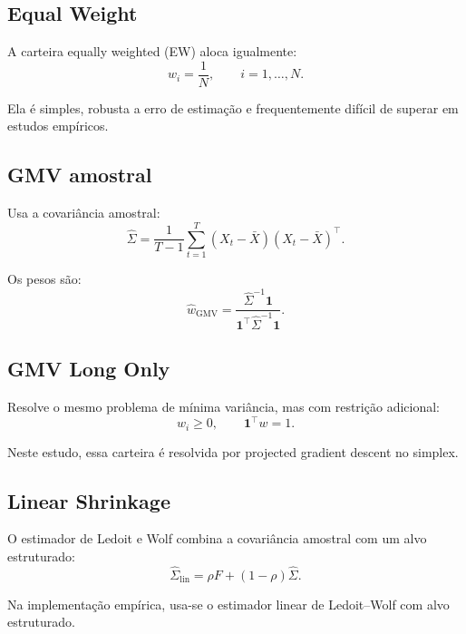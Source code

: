 \documentclass[12pt,a4paper]{article}
\newcommand{\one}{\mathbf{1}}
\newcommand{\what}{\widehat{w}}
\newcommand{\Sigmahat}{\widehat{\Sigma}}
\begin{document}
\subsection{Equal Weight}

A carteira equally weighted (EW) aloca igualmente:
\begin{equation}
  w_i = \frac{1}{N}, \qquad i=1,\dots,N.
\end{equation}

Ela é simples, robusta a erro de estimação e frequentemente difícil de superar em estudos
empíricos.

\subsection{GMV amostral}

Usa a covariância amostral:
\begin{equation}
  \Sigmahat
  =
  \frac{1}{T-1}
  \sum_{t=1}^{T}
  (X_t-\bar X)(X_t-\bar X)^\top.
\end{equation}

Os pesos são:
\begin{equation}
  \what_{\mathrm{GMV}}
  =
  \frac{\Sigmahat^{-1}\one}{\one^\top\Sigmahat^{-1}\one}.
\end{equation}

\subsection{GMV Long Only}

Resolve o mesmo problema de mínima variância, mas com restrição adicional:
\begin{equation}
  w_i \ge 0,
  \qquad
  \one^\top w=1.
\end{equation}

Neste estudo, essa carteira é resolvida por projected gradient descent no simplex.

\subsection{Linear Shrinkage}

O estimador de Ledoit e Wolf combina a covariância amostral com um alvo estruturado:
\begin{equation}
  \Sigmahat_{\mathrm{lin}}
  =
  \rho F + (1-\rho)\Sigmahat.
\end{equation}

Na implementação empírica, usa-se o estimador linear de Ledoit--Wolf com alvo estruturado.
\end{document}
